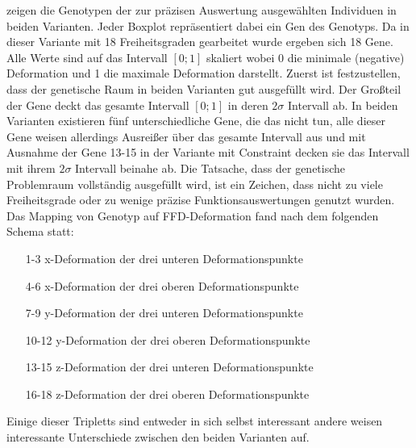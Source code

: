  zeigen die Genotypen der zur präzisen Auswertung ausgewählten Individuen in beiden Varianten.
Jeder Boxplot repräsentiert dabei ein Gen des Genotyps.
Da in dieser Variante mit 18 Freiheitsgraden gearbeitet wurde ergeben sich 18 Gene.
Alle Werte sind auf das Intervall $[0;1]$ skaliert wobei 0 die minimale (negative) Deformation und 1 die maximale Deformation darstellt.
Zuerst ist festzustellen, dass der genetische Raum in beiden Varianten gut ausgefüllt wird.
Der Großteil der Gene deckt das gesamte Intervall $[0;1]$ in deren $2\sigma$ Intervall ab.
In beiden Varianten existieren fünf unterschiedliche Gene, die das nicht tun, alle dieser Gene weisen allerdings Ausreißer über das gesamte Intervall aus und mit Ausnahme der Gene 13-15 in der Variante mit Constraint decken sie das Intervall mit ihrem $2\sigma$ Intervall beinahe ab.
Die Tatsache, dass der genetische Problemraum vollständig ausgefüllt wird, ist ein Zeichen, dass nicht zu viele Freiheitsgrade oder zu wenige präzise Funktionsauswertungen genutzt wurden.
Das Mapping von Genotyp auf FFD-Deformation fand nach dem folgenden Schema statt:
\begin{enumerate}
	\item[1-3] x-Deformation der drei unteren Deformationspunkte
	\item[4-6] x-Deformation der drei oberen Deformationspunkte
	\item[7-9] y-Deformation der drei unteren Deformationspunkte
	\item[10-12] y-Deformation der drei oberen Deformationspunkte
	\item[13-15] z-Deformation der drei unteren Deformationspunkte
	\item[16-18] z-Deformation der drei oberen Deformationspunkte
\end{enumerate}

Einige dieser Tripletts sind entweder in sich selbst interessant andere weisen interessante Unterschiede zwischen den beiden Varianten auf.

